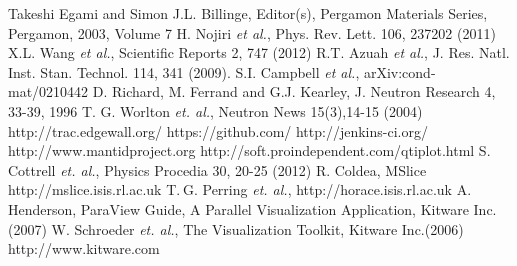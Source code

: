 \documentclass{elsarticle}
\begin{document}

\begin{thebibliography}{00}
 Takeshi Egami and Simon J.L. Billinge, Editor(s), Pergamon Materials Series, Pergamon, 2003, Volume 7
 H. Nojiri {\it et al.}, Phys. Rev. Lett. 106, 237202 (2011)
 X.L. Wang {\it et al.}, Scientific Reports 2, 747 (2012)
  R.T. Azuah {\it et al.}, J. Res. Natl. Inst. Stan. Technol. 114, 341 (2009).
 S.I. Campbell {\it et al.}, arXiv:cond-mat/0210442
 D. Richard, M. Ferrand and G.J. Kearley, J. Neutron Research 4, 33-39, 1996
 T. G. Worlton {\it et. al.}, Neutron News 15(3),14-15 (2004)  
 http://trac.edgewall.org/
 https://github.com/
 http://jenkins-ci.org/
 http://www.mantidproject.org
 http://soft.proindependent.com/qtiplot.html
 S. Cottrell {\it et. al.}, Physics Procedia 30, 20-25 (2012)
 R. Coldea, MSlice  http://mslice.isis.rl.ac.uk
 T. G. Perring {\it et. al.}, http://horace.isis.rl.ac.uk
 A. Henderson, ParaView Guide, A Parallel Visualization Application, Kitware Inc.(2007)
 W. Schroeder {\it et. al.}, The Visualization Toolkit, Kitware Inc.(2006)
 http://www.kitware.com

\end{thebibliography}
\end{document}
